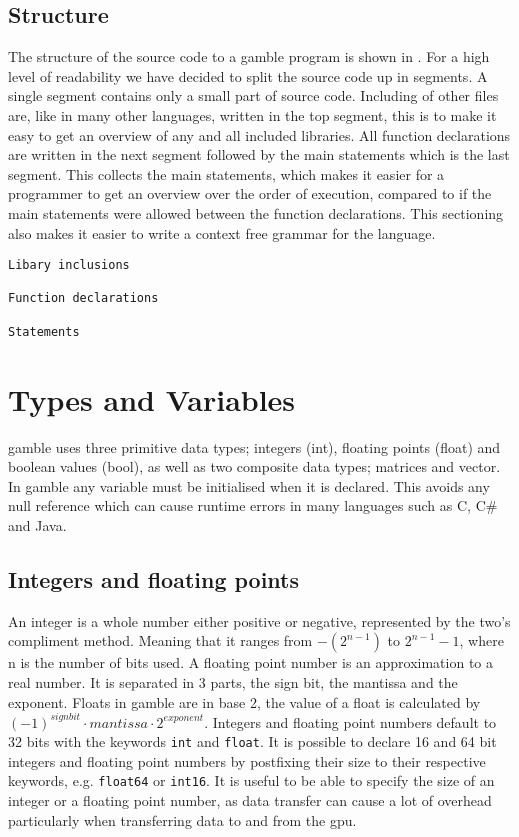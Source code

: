 \subsection*{Structure} 
The structure of the source code to a \gls{gamble} program is shown in .
For a high level of readability we have decided  to split the source code up in segments.
A single segment contains only a small part of source code.
Including of other files are, like in many other languages, written in the top segment, this is to make it easy to get an overview of any and all included libraries. 
All function declarations are written in the next segment followed by the main statements which is the last segment.
This collects the main statements, which makes it easier for a programmer to get an overview over the order of execution, compared to if the main statements were allowed between the function declarations.
This sectioning also makes it easier to write a context free grammar for the language.

\begin{lstlisting}[caption={Source code file layout in \gls{gamble}},frame=tlrb,label={lst:Structure}, numbers=none]
Libary inclusions

Function declarations

Statements
\end{lstlisting}

\section{Types and Variables} \label{sec:Types}
\gls{gamble} uses three primitive data types; integers (int), floating points (float) and boolean values (bool), as well as two composite data types; matrices and vector. 
In \gls{gamble} any variable must be initialised when it is declared. 
This avoids any null reference which can cause runtime errors in many languages such as C, C\# and Java. 

\subsection*{Integers and floating points}
An integer is a whole number either positive or negative, represented by the two's compliment method. 
Meaning that it ranges from $-(2^{n-1}) $ to $2^{n-1} - 1 $, where n is the number of bits used.
A floating point number is an approximation to a real number. 
It is separated in 3 parts, the sign bit, the mantissa and the exponent. 
Floats in \gls{gamble} are in base 2, the value of a float is calculated by $ (-1)^{sign bit} \cdot mantissa \cdot 2^{exponent} $. 
Integers and floating point numbers default to 32 bits with the keywords \texttt{int} and \texttt{float}. 
It is possible to declare 16 and 64 bit integers and floating point numbers by postfixing their size to their respective keywords, e.g. \texttt{float64} or \texttt{int16}. 
It is useful to be able to specify the size of an integer or a floating point number, as data transfer can cause a lot of overhead particularly when transferring data to and from the \acrshort{gpu}. 

